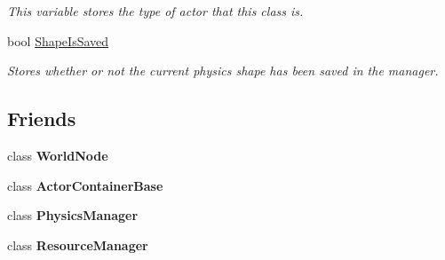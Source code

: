 \begin{DoxyCompactItemize}
\begin{DoxyCompactList}\small\item\em This variable stores the type of actor that this class is. \item\end{DoxyCompactList}\item 
\hypertarget{classphys_1_1ActorBase_a22c0ab01bdc3e1e5c656fb0f201f6929}{
bool \hyperlink{classphys_1_1ActorBase_a22c0ab01bdc3e1e5c656fb0f201f6929}{ShapeIsSaved}}
\label{d8/d0f/classphys_1_1ActorBase_a22c0ab01bdc3e1e5c656fb0f201f6929}

\begin{DoxyCompactList}\small\item\em Stores whether or not the current physics shape has been saved in the manager. \item\end{DoxyCompactList}\end{DoxyCompactItemize}
\subsection*{Friends}
\begin{DoxyCompactItemize}
\item 
\hypertarget{classphys_1_1ActorBase_a1cacd07efb11226da49a7c80569b18e8}{
class {\bfseries WorldNode}}
\label{d8/d0f/classphys_1_1ActorBase_a1cacd07efb11226da49a7c80569b18e8}

\item 
\hypertarget{classphys_1_1ActorBase_a54042fcfa7ab444a50ec79cbe3395356}{
class {\bfseries ActorContainerBase}}
\label{d8/d0f/classphys_1_1ActorBase_a54042fcfa7ab444a50ec79cbe3395356}

\item 
\hypertarget{classphys_1_1ActorBase_a139cf05ac01161b7071c8a037c841683}{
class {\bfseries PhysicsManager}}
\label{d8/d0f/classphys_1_1ActorBase_a139cf05ac01161b7071c8a037c841683}

\item 
\hypertarget{classphys_1_1ActorBase_a54c1252abc87a78a301e6b6984470408}{
class {\bfseries ResourceManager}}
\label{d8/d0f/classphys_1_1ActorBase_a54c1252abc87a78a301e6b6984470408}

\end{DoxyCompactItemize}


